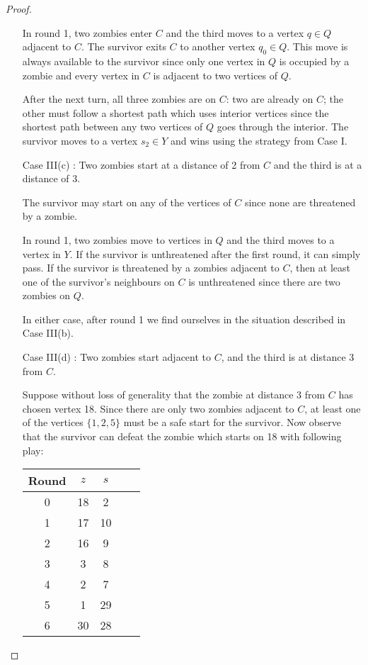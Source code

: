 \begin{proof}
\begin{enumerate}[I.]
In round 1, two zombies enter $C$ and the third moves to a vertex $q \in Q$ adjacent to $C$.
The survivor exits $C$ to another vertex $q_0 \in Q$. This move is always available to the survivor since only one vertex in $Q$ is occupied by
a zombie and every vertex in $C$ is adjacent to two vertices of $Q$.

After the next turn, all three zombies are on $C$: two are already on $C$; the other must follow a shortest path which uses interior vertices since the shortest path between any two vertices of $Q$ goes through the interior. The survivor moves to a vertex $s_2 \in Y$ and wins using the strategy from Case I.

\item[Case III(c)]: Two zombies start at a distance of 2 from $C$ and the third is at a distance of 3.

The survivor may start on any of the vertices of $C$ since none are threatened by a zombie.

In round 1, two zombies move to vertices in $Q$ and the third moves to a vertex in $Y$. If the survivor is unthreatened after the first round, it can simply pass.
If the survivor is threatened by a zombies adjacent to $C$, then at least one of the survivor's neighbours on $C$ is unthreatened since there are two zombies on $Q$.

In either case, after round 1 we find ourselves in the situation described in Case III(b).

\item[Case III(d)]: Two zombies start adjacent to $C$, and the third is at distance 3 from $C$.

Suppose without loss of generality that the zombie at distance 3 from $C$ has chosen vertex 18.
Since there are only two zombies adjacent to $C$, at least one of the vertices $\{1, 2, 5\}$ must be a safe start for the survivor. Now observe that the survivor can defeat the zombie which starts on 18 with following play:

\begin{tabular}{c | c | c | c | c }
Round & $z$ & $s$ \\
\hline
0 & 18 & 2 \\
1 & 17 & 10 \\
2 & 16 & 9 \\
3 & 3 & 8 \\
4 & 2 & 7 \\
5 & 1 & 29 \\
6 & 30 & 28
\end{tabular}


\end{enumerate}
\end{proof}
